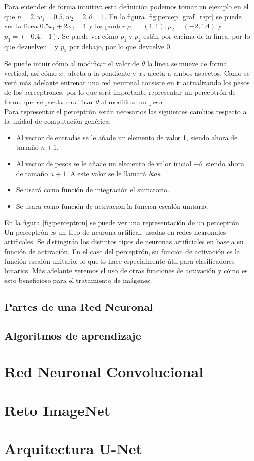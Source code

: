 Para entender de forma intuitiva esta definición podemos tomar un ejemplo en el que $ n = 2, w_1 = 0.5, w_2 = 2, \theta = 1 $. En la figura \ref{fig:percep_graf_repr} se puede ver la línea $ 0.5x_1 + 2x_2 = 1 $ y los puntos $ p_1=(1;1), p_2=(-2;1.4) $ y $ p_3=(-0.4;-1) $. Se puede ver cómo $ p_1 $ y $ p_2 $ están por encima de la línea, por lo que devuelven 1 y $ p_3 $ por debajo, por lo que devuelve 0.


Se puede intuir cómo al modificar el valor de $ \theta $ la línea se mueve de forma vertical, así cómo $ x_1 $ afecta a la pendiente y $ x_2 $ afecta a ambos aspectos. Como se verá más adelante entrenar una red neuronal consiste en ir actualizando los pesos de los perceptrones, por lo que será importante representar un perceptrón de forma que se pueda modificar $ \theta $ al modificar un peso.\\

Para representar el perceptrón serán necesarios los siguientes cambios respecto a la unidad de computación genérica:
\begin{itemize}
\item Al vector de entradas se le añade un elemento de valor 1, siendo ahora de tamaño $ n+1 $.
\item Al vector de pesos se le añade un elemento de valor inicial $ -\theta $, siendo ahora de tamaño $ n+1 $. A este valor se le llamará \textit{bias}.
\item Se usará como función de integración el sumatorio.
\item Se usara como función de activación la función escalón unitario.
\end{itemize}


En la figura \ref{fig:perceptron} se puede ver una representación de un perceptrón. Un perceptrón es un tipo de neurona artifical, usadas en redes neuronales artificales. Se distingirán los distintos tipos de neuronas artificiales en base a su función de activación. En el caso del perceptrón, su función de activación es la función escalón unitario, lo que lo hace especialmente útil para clasificadores binarios. Más adelante veremos el uso de otras funciones de activación y cómo es esto beneficioso para el tratamiento de imágenes.


\subsection{Partes de una Red Neuronal}\label{subsec:nn_partes}
\subsection{Algoritmos de aprendizaje}\label{subsec:learning_algos}
\section{Red Neuronal Convolucional}\label{sec:cnn}
\section{Reto ImageNet}\label{sec:imagenet}
\section{Arquitectura U-Net}\label{sec:unet}